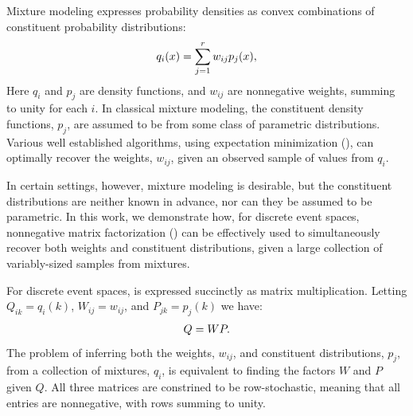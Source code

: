 \documentclass[conference]{IEEEtran}
\title{\vspace{-0.25em}\thetitle}
\author{
{\large{Stefan~Karpinski, John~R.~Gilbert, Elizabeth~M.~Belding}} \vspace{0.25em}\\
Department of Computer Science \\
University of California, Santa Barbara \vspace{0.35em}\\
\textit{\{sgk,gilbert,ebelding\}@cs.ucsb.edu}
}
\begin{document}
\maketitle

Mixture modeling expresses probability densities as convex combinations of constituent probability distributions:
\begin{align}\eqn{mixture-model}
  q_i(x) = \sum_{j=1}^r w_{ij} p_j(x),
\end{align}
Here $q_i$ and $p_j$ are density functions, and $w_{ij}$ are nonnegative weights, summing to unity for each $i$.
In classical mixture modeling, the constituent density functions, $p_j$, are assumed to be from some class of parametric distributions.
Various well established algorithms, using expectation minimization (), can optimally recover the weights, $w_{ij}$, given an observed sample of values from $q_i$.%

In certain settings, however, mixture modeling is desirable, but the constituent distributions are neither known in advance, nor can they be assumed to be parametric.
In this work, we demonstrate how, for discrete event spaces, nonnegative matrix factorization () can be effectively used to simultaneously recover both weights and constituent distributions, given a large collection of variably-sized samples from mixtures.

For discrete event spaces,  is expressed succinctly as matrix multiplication.
Letting $Q_{ik} = q_i(k)$, $W_{ij} = w_{ij}$, and $P_{jk} = p_j(k)$ we have:
\begin{align}\eqn{mixture-model-matrix}
  Q = WP.
\end{align}
The problem of inferring both the weights, $w_{ij}$, and constituent distributions, $p_j$, from a collection of mixtures, $q_i$, is equivalent to finding the factors $W$ and $P$ given $Q$.
All three matrices are constrined to be row-stochastic, meaning that all entries are nonnegative, with rows summing to unity.
\end{document}
